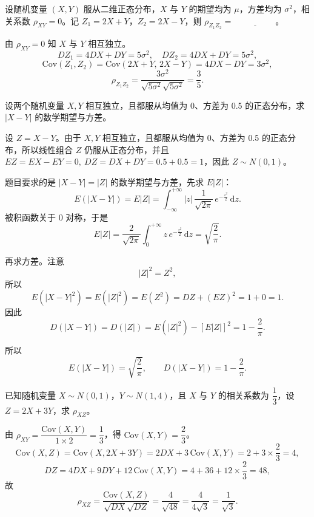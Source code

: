 ﻿\documentclass[lang=cn,11pt]{elegantbook}
\begin{document}
\begin{exercise}\label{exer:4-s2-z1z2}
设随机变量 \((X,Y)\) 服从二维正态分布，\(X\) 与 \(Y\) 的期望均为 \(\mu\)，方差均为 \(\sigma^2\)，相关系数 \(\rho_{XY} = 0\)。记 \(Z_1 = 2X+Y\)，\(Z_2 = 2X-Y\)，则 \(\rho_{Z_1Z_2} =\,\underline{\hspace{2cm}}\)。
\end{exercise}
\begin{solution}
由 \(\rho_{XY} = 0\) 知 \(X\) 与 \(Y\) 相互独立。
\[
DZ_1 = 4DX + DY = 5\sigma^2,\quad DZ_2 = 4DX + DY = 5\sigma^2,
\]
\[
\mathrm{Cov}(Z_1,Z_2) = \mathrm{Cov}(2X+Y,\, 2X-Y) = 4DX - DY = 3\sigma^2,
\]
\[
\rho_{Z_1Z_2} = \frac{3\sigma^2}{\sqrt{5\sigma^2}\sqrt{5\sigma^2}} = \frac{3}{5}.
\]
\end{solution}



\begin{exercise}\label{exer:4-15-absnormal}
设两个随机变量 \(X, Y\) 相互独立，且都服从均值为 0、方差为 0.5 的正态分布，求 \(|X-Y|\) 的数学期望与方差。
\end{exercise}

\begin{solution}
设 \(Z=X-Y\)。由于 \(X,Y\) 相互独立，且都服从均值为 0、方差为 0.5 的正态分布，所以线性组合 \(Z\) 仍服从正态分布，并且 \(EZ=EX-EY=0,\ DZ=DX+DY=0.5+0.5=1\)，因此 \(Z\sim N(0,1)\)。

题目要求的是 \(|X-Y|=|Z|\) 的数学期望与方差，先求 \(E|Z|\)：
\[
E(|X-Y|)=E|Z|=\int_{-\infty}^{+\infty}|z|\,\frac{1}{\sqrt{2\pi}}\,e^{-\frac{z^2}{2}}\,\mathrm{d}z.
\]
被积函数关于 0 对称，于是
\[
E|Z|=\frac{2}{\sqrt{2\pi}}\int_0^{+\infty} z\,e^{-\frac{z^2}{2}}\,\mathrm{d}z
=\sqrt{\frac{2}{\pi}}.
\]

再求方差。注意
\[
|Z|^2=Z^2,
\]
所以
\[
E(|X-Y|^2)=E(|Z|^2)=E(Z^2)=DZ+(EZ)^2=1+0=1.
\]
因此
\[
D(|X-Y|)=D(|Z|)=E(|Z|^2)-[E|Z|]^2=1-\frac{2}{\pi}.
\]

所以
\[
E(|X-Y|)=\sqrt{\frac{2}{\pi}},\qquad D(|X-Y|)=1-\frac{2}{\pi}.
\]
\end{solution}

\begin{exercise}\label{exer:4-16-multi}
已知随机变量 \(X \sim N(0,1)\)，\(Y \sim N(1,4)\)，且 \(X\) 与 \(Y\) 的相关系数为 \(\dfrac{1}{3}\)，设 \(Z = 2X + 3Y\)，求 \(\rho_{XZ}\)。
\end{exercise}
\begin{solution}
由 \(\rho_{XY} = \dfrac{\mathrm{Cov}(X,Y)}{1 \times 2} = \dfrac{1}{3}\)，得 \(\mathrm{Cov}(X,Y) = \dfrac{2}{3}\)。
\[
\mathrm{Cov}(X,Z) = \mathrm{Cov}(X, 2X+3Y) = 2DX + 3\,\mathrm{Cov}(X,Y) = 2 + 3 \times \frac{2}{3} = 4,
\]
\[
DZ = 4DX + 9DY + 12\,\mathrm{Cov}(X,Y) = 4 + 36 + 12 \times \frac{2}{3} = 48,
\]
故
\[
\rho_{XZ} = \frac{\mathrm{Cov}(X,Z)}{\sqrt{DX}\sqrt{DZ}} = \frac{4}{\sqrt{48}} = \frac{4}{4\sqrt{3}} = \frac{1}{\sqrt{3}}.
\]
\end{solution}
\end{document}
